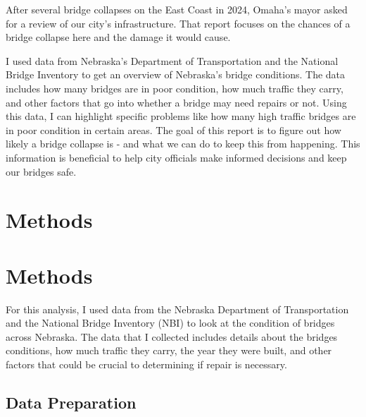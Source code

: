 \documentclass[
  letterpaper,
  DIV=11,
  numbers=noendperiod]{scrreprt}
\begin{document}
After several bridge collapses on the East Coast in 2024, Omaha's mayor
asked for a review of our city's infrastructure. That report focuses on
the chances of a bridge collapse here and the damage it would cause.

I used data from Nebraska's Department of Transportation and the
National Bridge Inventory to get an overview of Nebraska's bridge
conditions. The data includes how many bridges are in poor condition,
how much traffic they carry, and other factors that go into whether a
bridge may need repairs or not. Using this data, I can highlight
specific problems like how many high traffic bridges are in poor
condition in certain areas. The goal of this report is to figure out how
likely a bridge collapse is - and what we can do to keep this from
happening. This information is beneficial to help city officials make
informed decisions and keep our bridges safe.


\chapter{Methods}\label{methods-1}


\chapter{Methods}\label{methods-2}

For this analysis, I used data from the Nebraska Department of
Transportation and the National Bridge Inventory (NBI) to look at the
condition of bridges across Nebraska. The data that I collected includes
details about the bridges conditions, how much traffic they carry, the
year they were built, and other factors that could be crucial to
determining if repair is necessary.

\section{Data Preparation}\label{data-preparation}
\end{document}
